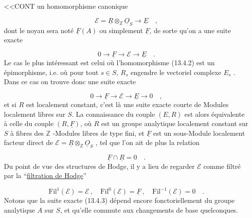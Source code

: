 
<<CONT un homomorphisme canonique

\begin{equation}\tag{13.4.2}
\mathcal{E} = \underline{R} \otimes_{\mathbb{Z}} \underline{O}_S \longrightarrow \underline{E} \quad ,
\end{equation}
dont le noyau sera noté $\underline{F}(A)$ ou simplement $\underline{F}$, de sorte qu'on a une suite exacte

\begin{equation}\tag{13.4.3}
0 \longrightarrow \underline{F} \longrightarrow \mathcal{E} \longrightarrow \underline{E} \quad .
\end{equation}
Le cas le plus intéressant est celui où l'homomorphisme (13.4.2) est un épimorphisme, i.e. où pour tout $s \in S$, $R_s$ engendre le vectoriel complexe $E_s$ . Dans ce cas on trouve donc une suite exacte

\begin{equation}\tag{13.4.4}
0 \longrightarrow \underline{F} \longrightarrow \mathcal{E} \longrightarrow \underline{E} \longrightarrow 0 \quad ,
\end{equation}
et si $R$ est localement constant, c'est là une suite exacte courte de Modules localement libres sur $S$. La connaissance du couple $(E,R)$ est alors équivalente à celle du couple $(R,\underline{F})$, où $R$ est un groupe analytique localement constant sur $S$ à fibres des $\mathbb{Z}$ -Modules libres de type fini, et $\underline{F}$ est un sous-Module localement facteur direct de $\mathcal{E} = \underline{R} \otimes_{\mathbb{Z}} \underline{O}_S$ , tel que l'on ait de plus la relation

\begin{equation}\tag{13.4.5}
\underline{F} \cap \underline{R} = 0 \quad .
\end{equation}
Du point de vue des structures de Hodge, il y a lieu de regarder $\mathcal{E}$ comme filtré par la ``\underline{filtration de Hodge}''

\begin{equation}\tag{13.4.6}
\mathrm{Fil}^{1}(\mathcal{E}) = \mathcal{E} \ , \quad \mathrm{Fil}^{0}(\mathcal{E}) = \underline{F} \ , \quad \mathrm{Fil}^{-1}(\mathcal{E}) = 0 \quad .
\end{equation}
Notons que la suite exacte (13.4.3) dépend encore fonctoriellement du groupe analytique $A$ sur $S$, et qu'elle commute aux changements de base quelconques.


